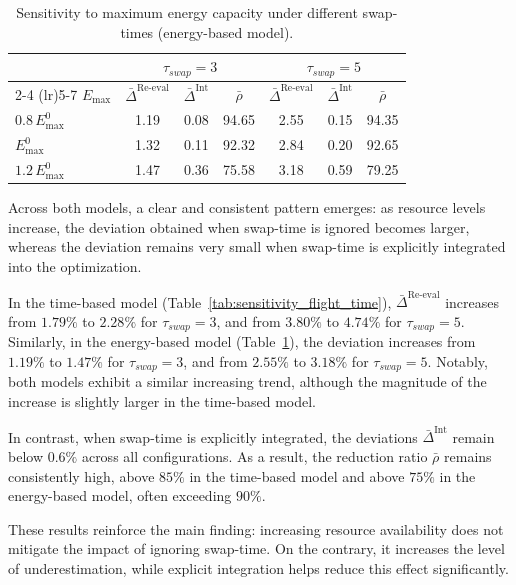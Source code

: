 \documentclass[3p, authoryear, 11pt]{elsarticle}
\begin{document}
\begin{table}[H]
\centering
\caption{Sensitivity to maximum energy capacity under different swap-times (energy-based model).}
\label{tab:sensitivity_energy}
\scriptsize
\begin{tabular}{lcccccc}
\toprule
& \multicolumn{3}{c}{$\tau_{swap}=3$} &
  \multicolumn{3}{c}{$\tau_{swap}=5$} \\
\cmidrule(lr){2-4} \cmidrule(lr){5-7}
$E_{\max}$ &
$\bar{\Delta}^{\mathrm{Re\text{-}eval}}$ &
$\bar{\Delta}^{\mathrm{Int}}$ &
$\bar{\rho}$ &
$\bar{\Delta}^{\mathrm{Re\text{-}eval}}$ &
$\bar{\Delta}^{\mathrm{Int}}$ &
$\bar{\rho}$ \\
\midrule
$0.8\,E_{\max}^{0}$ & 1.19 & 0.08 & 94.65 & 2.55 & 0.15 & 94.35 \\
$E_{\max}^{0}$     & 1.32 & 0.11 & 92.32 & 2.84 & 0.20 & 92.65 \\
$1.2\,E_{\max}^{0}$ & 1.47 & 0.36 & 75.58 & 3.18 & 0.59 & 79.25 \\
\bottomrule
\end{tabular}
\end{table}

Across both models, a clear and consistent pattern emerges: as resource levels increase, the deviation obtained when swap-time is ignored becomes larger, whereas the deviation remains very small when swap-time is explicitly integrated into the optimization.

\newpage
In the time-based model (Table~\ref{tab:sensitivity_flight_time}), $\bar{\Delta}^{\mathrm{Re\text{-}eval}}$ increases from $1.79\%$ to $2.28\%$ for $\tau_{swap}=3$, and from $3.80\%$ to $4.74\%$ for $\tau_{swap}=5$. 
Similarly, in the energy-based model (Table~\ref{tab:sensitivity_energy}), the deviation increases from $1.19\%$ to $1.47\%$ for $\tau_{swap}=3$, and from $2.55\%$ to $3.18\%$ for $\tau_{swap}=5$. 
Notably, both models exhibit a similar increasing trend, although the magnitude of the increase is slightly larger in the time-based model.

In contrast, when swap-time is explicitly integrated, the deviations $\bar{\Delta}^{\mathrm{Int}}$ remain below $0.6\%$ across all configurations. 
As a result, the reduction ratio $\bar{\rho}$ remains consistently high, above $85\%$ in the time-based model and above $75\%$ in the energy-based model, often exceeding $90\%$.

These results reinforce the main finding: increasing resource availability does not mitigate the impact of ignoring swap-time. 
On the contrary, it increases the level of underestimation, while explicit integration helps reduce this effect significantly.
\end{document}
